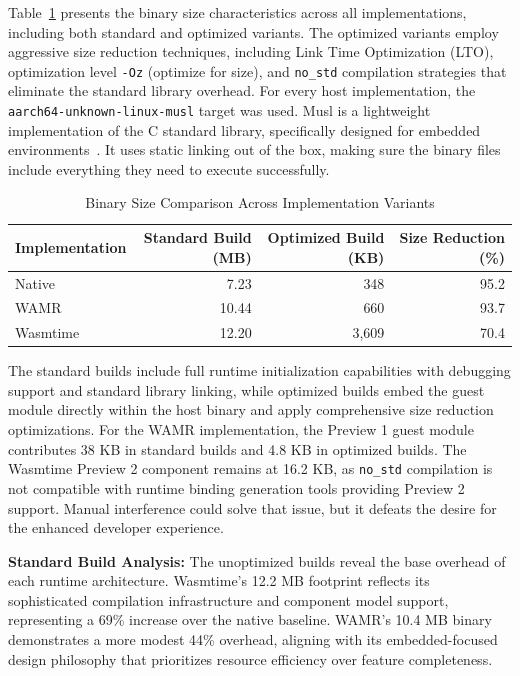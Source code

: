 Table~\ref{tab:binary-sizes} presents the binary size characteristics across all implementations, including both standard and optimized variants. The optimized variants employ aggressive size reduction techniques, including Link Time Optimization (LTO), optimization level \texttt{-Oz} (optimize for size), and \texttt{no\_std} compilation strategies that eliminate the standard library overhead. For every host implementation, the \texttt{aarch64-unknown-linux-musl} target was used. Musl is a lightweight implementation of the C standard library, specifically designed for embedded environments~\cite{musl}. It uses static linking out of the box, making sure the binary files include everything they need to execute successfully.

\begin{table}[H]
\centering
\caption{Binary Size Comparison Across Implementation Variants}
\label{tab:binary-sizes}
\begin{tabular}{lrrr}
\toprule
\textbf{Implementation} & \textbf{Standard Build (MB)} & \textbf{Optimized Build (KB)} & \textbf{Size Reduction (\%)} \\
\midrule
Native              & 7.23  & 348   & 95.2 \\
WAMR                & 10.44 & 660   & 93.7 \\
Wasmtime            & 12.20 & 3,609 & 70.4 \\
\bottomrule
\end{tabular}
\end{table}

The standard builds include full runtime initialization capabilities with debugging support and standard library linking, while optimized builds embed the guest module directly within the host binary and apply comprehensive size reduction optimizations. For the WAMR implementation, the Preview 1 guest module contributes 38 KB in standard builds and 4.8 KB in optimized builds. The Wasmtime Preview 2 component remains at 16.2 KB, as \texttt{no\_std} compilation is not compatible with runtime binding generation tools providing Preview 2 support. Manual interference could solve that issue, but it defeats the desire for the enhanced developer experience.

\textbf{Standard Build Analysis:} The unoptimized builds reveal the base overhead of each runtime architecture. Wasmtime's 12.2 MB footprint reflects its sophisticated compilation infrastructure and component model support, representing a 69\% increase over the native baseline. WAMR's 10.4 MB binary demonstrates a more modest 44\% overhead, aligning with its embedded-focused design philosophy that prioritizes resource efficiency over feature completeness.


